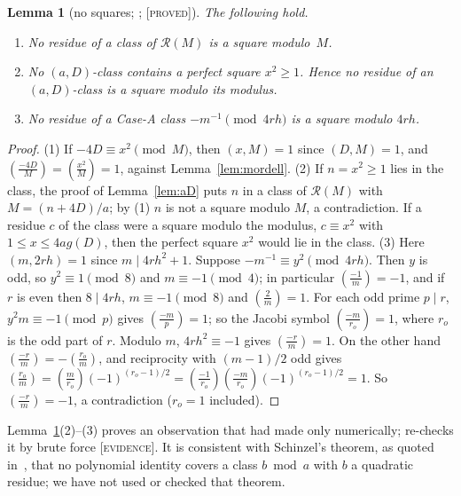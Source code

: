\documentclass[10pt,reqno]{amsart}
\newtheorem{lemma}[theorem]{Lemma}
\theoremstyle{definition}
\theoremstyle{remark}
\newcommand{\cR}{\mathscr R}
\newcommand{\lab}[1]{\textup{[\textsc{#1}]}}
\begin{document}
\begin{lemma}[no squares; {\cite[Lemmas~2.1, 2.2]{KA2}}; \lab{proved}]\label{lem:nosquare}
The following hold.
\begin{enumerate}
\item No residue of a class of $\cR(M)$ is a square modulo~$M$.
\item No $(a,D)$-class contains a perfect square $x^2\geq1$.  Hence
  no residue of an $(a,D)$-class is a square modulo its modulus.
\item No residue of a Case-A class $-m^{-1}\pmod{4rh}$ is a square modulo
  $4rh$.
\end{enumerate}
\end{lemma}
\begin{proof}
(1) If $-4D\equiv x^2\pmod M$, then $(x,M)=1$ since $(D,M)=1$, and
$(\frac{-4D}M)=(\frac{x^2}M)=1$, against Lemma~\ref{lem:mordell}.
(2) If $n=x^2\geq1$ lies in the class, the proof of Lemma~\ref{lem:aD}
puts $n$ in a class of $\cR(M)$ with $M=(n+4D)/a$; by (1) $n$ is not a
square modulo $M$, a contradiction.  If a residue $c$ of the class were
a square modulo the modulus, $c\equiv x^2$ with $1\leq x\leq 4ag(D)$,
then the perfect square $x^2$ would lie in the class.
(3) Here $(m,2rh)=1$ since $m\mid4rh^2+1$.  Suppose
$-m^{-1}\equiv y^2\pmod{4rh}$.  Then $y$ is odd, so $y^2\equiv1\pmod8$ and
$m\equiv-1\pmod4$; in particular $(\frac{-1}m)=-1$, and if $r$ is even then
$8\mid4rh$, $m\equiv-1\pmod8$ and $(\frac2m)=1$.  For each odd prime
$p\mid r$, $y^2m\equiv-1\pmod p$ gives $(\frac{-m}p)=1$; so the Jacobi symbol
$(\frac{-m}{r_o})=1$, where $r_o$ is the odd part of $r$.  Modulo $m$,
$4rh^2\equiv-1$ gives $(\frac{-r}m)=1$.  On the other hand
$(\frac{-r}m)=-(\frac{r_o}m)$, and reciprocity with $(m-1)/2$ odd gives
$(\frac{r_o}m)=(\frac m{r_o})(-1)^{(r_o-1)/2}
=(\frac{-1}{r_o})(\frac{-m}{r_o})(-1)^{(r_o-1)/2}=1$.  So
$(\frac{-r}m)=-1$, a contradiction ($r_o=1$ included).
\end{proof}
Lemma~\ref{lem:nosquare}(2)--(3) proves an observation that \cite{TW}
had made only numerically; \cite[\S7]{KA2} re-checks it by brute force
\lab{evidence}.  It is consistent with Schinzel's theorem, as quoted
in~\cite{ElsholtzTao}, that no polynomial identity covers a class
$b\bmod a$ with $b$ a quadratic residue; we have not used or checked
that theorem.
\end{document}
